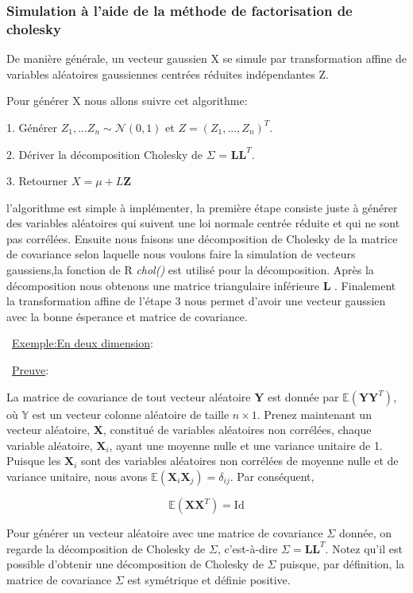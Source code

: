 \documentclass[10pt]{article} %
\begin{document}
 \subsubsection{Simulation à l'aide de la méthode de factorisation de cholesky}

 De manière générale, un vecteur gaussien X se simule par transformation affine de
 variables aléatoires gaussiennes centrées réduites indépendantes Z.

 Pour générer X nous allons suivre cet algorithme:\

 1. Générer $Z_1, ... Z_n \sim \mathcal{N}(0 , 1)$ et $Z = (Z_1,...,Z_n)^T$.

 2. Dériver la décomposition Cholesky de $\Sigma$ = $\textbf{LL}^T$.

 3. Retourner $X = \mu + L\textbf{Z}$


 l'algorithme est simple à implémenter, la première étape consiste juste à générer des variables aléatoires qui suivent une loi normale centrée réduite et qui ne sont pas corrélées. Ensuite nous faisons une décomposition de Cholesky de la matrice de covariance selon laquelle nous voulons faire la simulation de vecteurs gaussiens,la fonction de R {\it chol()} est utilisé pour la décomposition. Après la décomposition nous obtenons une matrice triangulaire inférieure \textbf{L} .
 Finalement la transformation affine de l'étape 3 nous permet d'avoir une vecteur gaussien avec la bonne ésperance et matrice de covariance.

 \
 \underline{Exemple:En deux dimension}:



 \
 \underline{Preuve}:

 La matrice de covariance de tout vecteur aléatoire $ \textbf{Y} $
 est donnée par $\mathbb{E}(\textbf{YY}^T)$, où $ \mathbb{Y} $ est
 un vecteur colonne aléatoire de taille $n \times 1$. Prenez maintenant un vecteur aléatoire,
 $\textbf{X}$, constitué de variables aléatoires
  non corrélées, chaque variable aléatoire, $\textbf{X}_i$, ayant une moyenne nulle et une variance unitaire de 1. Puisque les $\textbf{X}_i$
  sont des variables aléatoires non corrélées de moyenne nulle et de variance unitaire, nous avons $\mathbb{E}(\textbf{X}_i\textbf{X}_j)= \delta_{ij} $.
  Par conséquent,

$$\mathbb{E}(\textbf{XX}^T) = \text{Id} $$


Pour générer un vecteur aléatoire avec une matrice de covariance $\Sigma$ donnée, on regarde la décomposition de Cholesky de $\Sigma$,
c'est-à-dire $\Sigma =\textbf{LL}^T $. Notez qu'il est possible d'obtenir une décomposition de Cholesky de $\Sigma$ puisque, par définition,
la matrice de covariance $\Sigma $ est symétrique et définie positive.
\end{document}
